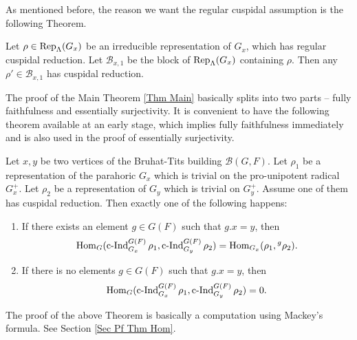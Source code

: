 	As mentioned before, the reason we want the regular cuspidal assumption is the following Theorem. 
	
	\begin{theorem}\label{Thm Cusp Red}
		Let $\rho \in \operatorname{\operatorname{Rep}}_{\Lambda}(G_x)$ be an irreducible representation of $G_x$, which has regular cuspidal reduction. Let $\mathcal{B}_{x,1}$ be the block of $\operatorname{\operatorname{Rep}}_{\Lambda}(G_x)$ containing $\rho$. Then any $\rho' \in \mathcal{B}_{x,1}$ has cuspidal reduction.
	\end{theorem}
	
	The proof of the Main Theorem \ref{Thm Main} basically splits into two parts -- fully faithfulness and essentially surjectivity. It is convenient to have the following theorem available at an early stage, which implies fully faithfulness immediately and is also used in the proof of essentially surjectivity.
	
	\begin{theorem}\label{Thm Hom}
		Let $x, y$ be two vertices of the Bruhat-Tits building $\mathcal{B}(G, F)$. Let $\rho_1$ be a representation of the parahoric $G_x$ which is trivial on the pro-unipotent radical $G_x^+$. Let $\rho_2$ be a representation of $G_y$ which is trivial on $G_y^+$. Assume one of them has cuspidal reduction. Then exactly one of the following happens:
		\begin{enumerate}
			\item If there exists an element $g \in G(F)$ such that $g.x=y$, then
			$$\operatorname{\operatorname{Hom}}_G(\operatorname{\operatorname{c-Ind}}_{G_x}^{G(F)}\rho_1, \operatorname{\operatorname{c-Ind}}_{G_y}^{G(F)}\rho_2)=\operatorname{\operatorname{Hom}}_{G_x}(\rho_1, {^g\rho_2}).$$
			\item If there is no elements $g \in G(F)$ such that $g.x=y$, then
			$$\operatorname{\operatorname{Hom}}_G(\operatorname{\operatorname{c-Ind}}_{G_x}^{G(F)}\rho_1, \operatorname{\operatorname{c-Ind}}_{G_y}^{G(F)}\rho_2)=0.$$
		\end{enumerate}
	\end{theorem}
	
	The proof of the above Theorem is basically a computation using Mackey's formula. See Section \ref{Sec Pf Thm Hom}.
	
